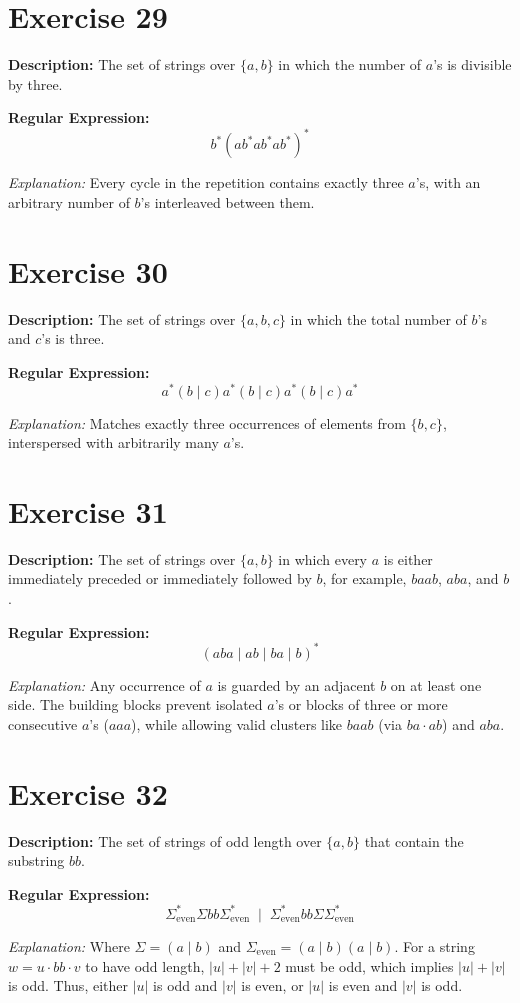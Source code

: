 \documentclass[12pt]{article}
\newcommand{\exercisedescription}[1]{%
    \Needspace{4\baselineskip}%
    \noindent\textbf{Description:} #1\par
    \vspace{0.25cm}
}
\newcommand{\reexpression}[1]{%
    \noindent\textbf{Regular Expression:}
    \vspace{-0.25cm}
    \begin{equation*}
        #1
    \end{equation*}
    \vspace{-0.15cm}
}
\newcommand{\reexplanation}[1]{%
    \noindent\textit{Explanation:} #1\par
    \vspace{0.55cm}
}
\begin{document}

\section*{Exercise 29}
\exercisedescription{%
    The set of strings over $\{a,b\}$ in which the number of $a$'s is divisible by three.
}
\reexpression{%
    b^* (a b^* a b^* a b^*)^*
}
\reexplanation{%
    Every cycle in the repetition contains exactly three $a$'s, with an arbitrary number of $b$'s interleaved between them.
}


\section*{Exercise 30}
\exercisedescription{%
    The set of strings over $\{a,b,c\}$ in which the total number of $b$'s and $c$'s is three.
}
\reexpression{%
    a^* (b \mid c) a^* (b \mid c) a^* (b \mid c) a^*
}
\reexplanation{%
    Matches exactly three occurrences of elements from $\{b, c\}$, interspersed with arbitrarily many $a$'s.
}


\section*{Exercise 31}
\exercisedescription{%
    The set of strings over $\{a,b\}$ in which every $a$ is either immediately preceded or immediately followed by $b$, for example, $baab$, $aba$, and $b$.
}
\reexpression{%
    (aba \mid ab \mid ba \mid b)^*
}
\reexplanation{%
    Any occurrence of $a$ is guarded by an adjacent $b$ on at least one side. The building blocks prevent isolated $a$'s or blocks of three or more consecutive $a$'s ($aaa$), while allowing valid clusters like $baab$ (via $ba \cdot ab$) and $aba$.
}
\newpage


\section*{Exercise 32}
\exercisedescription{%
    The set of strings of odd length over $\{a,b\}$ that contain the substring $bb$.
}
\reexpression{%
    \Sigma_{\text{even}}^* \Sigma bb \Sigma_{\text{even}}^* \;\mid\; \Sigma_{\text{even}}^* bb \Sigma \Sigma_{\text{even}}^*
}
\reexplanation{%
    Where $\Sigma = (a \mid b)$ and $\Sigma_{\text{even}} = (a \mid b)(a \mid b)$. For a string $w = u \cdot bb \cdot v$ to have odd length, $|u| + |v| + 2$ must be odd, which implies $|u| + |v|$ is odd. Thus, either $|u|$ is odd and $|v|$ is even, or $|u|$ is even and $|v|$ is odd.
}
\end{document}
